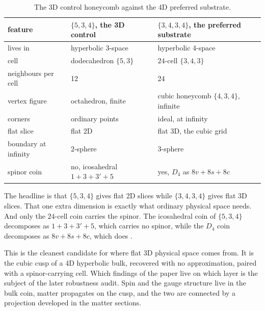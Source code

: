 \begin{table}[ht]
\centering
\begin{tabular}{@{}lll@{}}
\toprule
feature & $\{5,3,4\}$, the 3D control & $\{3,4,3,4\}$, the preferred substrate \\
\midrule
lives in & hyperbolic 3-space & hyperbolic 4-space \\
cell & dodecahedron $\{5,3\}$ & $24$-cell $\{3,4,3\}$ \\
neighbours per cell & 12 & 24 \\
vertex figure & octahedron, finite & cubic honeycomb $\{4,3,4\}$, infinite \\
corners & ordinary points & ideal, at infinity \\
flat slice & flat 2D & flat 3D, the cubic grid \\
boundary at infinity & $2$-sphere & $3$-sphere \\
spinor coin & no, icosahedral $1+3+3'+5$ & yes, $D_4$ as $8v+8s+8c$ \\
\bottomrule
\end{tabular}
\caption{The 3D control honeycomb against the 4D preferred substrate.}
\end{table}

The headline is that $\{5,3,4\}$ gives flat 2D slices while $\{3,4,3,4\}$ gives flat 3D slices. That one extra dimension is exactly what ordinary physical space needs. And only the $24$-cell coin carries the spinor. The icosahedral coin of $\{5,3,4\}$ decomposes as $1 + 3 + 3' + 5$, which carries no spinor, while the $D_4$ coin decomposes as $8v + 8s + 8c$, which does \cite{pollard2026vibetest}.


This is the cleanest candidate for where flat 3D physical space comes from. It is the cubic cusp of a 4D hyperbolic bulk, recovered with no approximation, paired with a spinor-carrying cell. Which findings of the paper live on which layer is the subject of the later robustness audit. Spin and the gauge structure live in the bulk coin, matter propagates on the cusp, and the two are connected by a projection developed in the matter sections.
